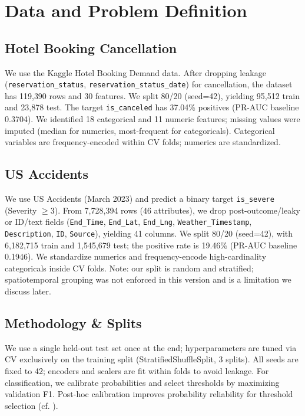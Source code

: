 \documentclass[conference]{IEEEtran}
\newcommand{\datasetA}{Hotel Booking Cancellation}
\newcommand{\datasetB}{US Accidents}
\newcommand{\seed}{42}
\begin{document}
\section{Data and Problem Definition}
\subsection{\datasetA}
We use the Kaggle Hotel Booking Demand data. After dropping leakage (\texttt{reservation\_status}, \texttt{reservation\_status\_date}) for cancellation, the dataset has 119{,}390 rows and 30 features. We split 80/20 (seed=\seed), yielding 95{,}512 train and 23{,}878 test. The target \texttt{is\_canceled} has 37.04\% positives (PR-AUC baseline 0.3704). We identified 18 categorical and 11 numeric features; missing values were imputed (median for numerics, most-frequent for categoricals). Categorical variables are frequency-encoded within CV folds; numerics are standardized.

\subsection{\datasetB}
We use US Accidents (March 2023) and predict a binary target \texttt{is\_severe} (Severity $\geq 3$). From 7{,}728{,}394 rows (46 attributes), we drop post-outcome/leaky or ID/text fields (\texttt{End\_Time}, \texttt{End\_Lat}, \texttt{End\_Lng}, \texttt{Weather\_Timestamp}, \texttt{Description}, \texttt{ID}, \texttt{Source}), yielding 41 columns. We split 80/20 (seed=\seed), with 6{,}182{,}715 train and 1{,}545{,}679 test; the positive rate is 19.46\% (PR-AUC baseline 0.1946). We standardize numerics and frequency-encode high-cardinality categoricals inside CV folds. Note: our split is random and stratified; spatiotemporal grouping was not enforced in this version and is a limitation we discuss later.

\subsection{Methodology \& Splits}
We use a single held-out test set once at the end; hyperparameters are tuned via CV exclusively on the training split (StratifiedShuffleSplit, 3 splits). All seeds are fixed to \seed{}; encoders and scalers are fit within folds to avoid leakage. For classification, we calibrate probabilities and select thresholds by maximizing validation F1. Post-hoc calibration improves probability reliability for threshold selection (cf. \cite{Kull2019DirichletCal}).
\end{document}

